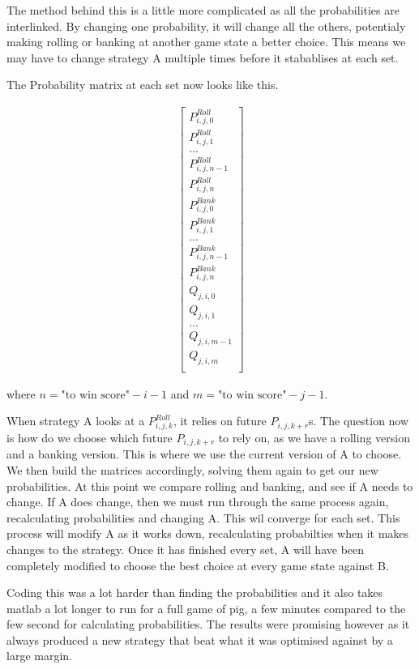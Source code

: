 \documentclass[a4paper,titlepage]{article}
\begin{document}
The method behind this is a little more complicated as all the probabilities are interlinked. By changing one probability, it will change all the others, potentialy making rolling or banking at another game state a better choice. This means we may have to change strategy A multiple times before it stabablises at each set.

The Probability matrix at each set now looks like this.

\begin{align}
	\begin{bmatrix}
		P^{Roll}_{i,j,0}\\
		P^{Roll}_{i,j,1}\\
		...\\
		P^{Roll}_{i,j,n-1}\\
		P^{Roll}_{i,j,n}\\
		P^{Bank}_{i,j,0}\\
		P^{Bank}_{i,j,1}\\
		...\\
		P^{Bank}_{i,j,n-1}\\
		P^{Bank}_{i,j,n}\\
		Q_{j,i,0}\\
		Q_{j,i,1}\\
		...\\
		Q_{j,i,m-1}\\
		Q_{j,i,m}\\
	\end{bmatrix}
\end{align}

where $n=\text{"to win score"}-i-1$ and $m=\text{"to win score"}-j-1$.

When strategy A looks at a $P^{Roll}_{i,j,k}$, it relies on future $P_{i,j,k+r}$s. The question now is how do we choose which future $P_{i,j,k+r}$ to rely on, as we have a rolling version and a banking version. This is where we use the current version of A to choose. We then build the matrices accordingly, solving them again to get our new probabilities. At this point we compare rolling and banking, and see if A needs to change. If A does change, then we must run through the same process again, recalculating probabilities and changing A. This wil converge for each set. This process will modify A as it works down, recalculating probabilties when it makes changes to the strategy. Once it has finished every set, A will have been completely modified to choose the best choice at every game state against B.

Coding this was a lot harder than finding the probabilities and it also takes matlab a lot longer to run for a full game of pig, a few minutes compared to the few second for calculating probabilities. The results were promising however as it always produced a new strategy that beat what it was optimised against by a large margin.
\end{document}
